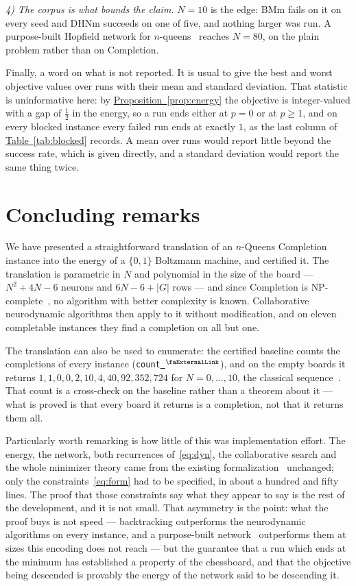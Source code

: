 \documentclass{easychair}
\newcommand{\citeref}[1]{\textcolor{academicpurple}{\cite{#1}}}
\newcommand{\propref}[1]{\textcolor{academicpurple}{\hyperref[#1]{Proposition~\ref*{#1}}}}
\newcommand{\tabref}[1]{\textcolor{academicpurple}{\hyperref[#1]{Table~\ref*{#1}}}}
\newcommand{\extlink}{~\ensuremath{{}^\text{\faExternalLink}}}
\newcommand{\repoowner}{mkaratarakis/HNBM}
\newcommand{\reporef}{1bd91612ee31180f6c99fa11090b713f3012ead4}
\newcommand{\repo}{https://github.com/\repoowner/blob/\reporef}
\newcommand{\srcl}[2]{\href{\repo/#1\#L#2}{\extlink}}
\newcommand{\qsrc}[2]{\srcl{HopfieldNet/QUBO/Instances/Queens/#1}{#2}}
\begin{document}
\emph{4) The corpus is what bounds the claim.} $N = 10$ is the edge: BMm fails on it on every seed
and DHNm succeeds on one of five, and nothing larger was run. A purpose-built Hopfield network for
$n$-queens~\citeref{mandziuk1995} reaches $N = 80$, on the plain problem rather than on Completion.

Finally, a word on what is not reported. It is usual to give the best and worst objective values
over runs with their mean and standard deviation. That statistic is uninformative here: by
\propref{prop:energy} the objective is integer-valued with a gap of $\tfrac12$ in the energy, so a run
ends either at $p = 0$ or at $p \ge 1$, and on every blocked instance every failed run ends at
exactly $1$, as the last column of \tabref{tab:blocked} records. A mean over runs would report
little beyond the success rate, which is given directly, and a standard deviation would report the
same thing twice.

\section{Concluding remarks}\label{sec:concl}

We have presented a straightforward translation of an $n$-Queens Completion instance into the energy
of a $\{0,1\}$ Boltzmann machine, and certified it. The translation is parametric in $N$ and
polynomial in the size of the board --- $N^{2} + 4N - 6$ neurons and $6N - 6 + |G|$ rows --- and
since Completion is \textsf{NP}-complete~\citeref{gent2017}, no algorithm with better complexity is
known. Collaborative neurodynamic algorithms then apply to it without modification, and on eleven
completable instances they find a completion on all but one.

The translation can also be used to enumerate: the certified baseline counts the completions of
every instance (\lstinline{count}\qsrc{Baseline.lean}{84}), and on the empty boards it returns $1, 1, 0, 0, 2, 10, 4, 40, 92, 352, 724$ for
$N = 0,\dots,10$, the classical sequence~\citeref{oeis170}. That count is a cross-check on the baseline rather than a
theorem about it --- what is proved is that every board it returns is a completion, not that it
returns them all.

Particularly worth remarking is how little of this was implementation effort. The energy, the
network, both recurrences of~\eqref{eq:dyn}, the collaborative search and the whole minimizer theory
came from the existing formalization~\citeref{hnbm} unchanged; only the constraints~\eqref{eq:form}
had to be specified, in about a hundred and fifty lines. The proof that those constraints say what
they appear to say is the rest of the development, and it is not small. That asymmetry is the point:
what the proof buys is not speed --- backtracking outperforms the neurodynamic algorithms on every
instance, and a purpose-built network~\citeref{mandziuk1995} outperforms them at sizes this encoding
does not reach --- but the guarantee that a run which ends at the minimum has established a property
of the chessboard, and that the objective being descended is provably the energy of the network said
to be descending it.
\end{document}

